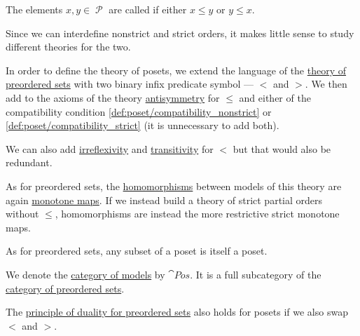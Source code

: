 \begin{definition}
  The elements \( x, y \in \mscrP \) are called  if either \( x \leq y \) or \( y \leq x \).

  \begin{thmenum}[resume=def:poset]
     Since we can interdefine nonstrict and strict orders, it makes little sense to study different theories for the two.

    In order to define the theory of posets, we extend the language of the \hyperref[def:preordered_set/theory]{theory of preordered sets} with two binary infix predicate symbol --- \( < \) and \( > \). We then add to the axioms of the theory \hyperref[def:binary_relation/antisymmetric]{antisymmetry} for \( \leq \) and either of the compatibility condition \eqref{def:poset/compatibility_nonstrict} or \eqref{def:poset/compatibility_strict} (it is unnecessary to add both).

    We can also add \hyperref[def:binary_relation/irreflexive]{irreflexivity} and \hyperref[def:binary_relation/transitive]{transitivity} for \( < \) but that would also be redundant.

     As for preordered sets, the \hyperref[def:first_order_homomorphism]{homomorphisms} between models of this theory are again \hyperref[def:preordered_set/homomorphism]{monotone maps}. If we instead build a theory of strict partial orders without \( \leq \), homomorphisms are instead the more restrictive strict monotone maps.

     As for preordered sets, any subset of a poset is itself a poset.

     We denote the \hyperref[def:category_of_first_order_models]{category of models} by \( \cat{Pos} \). It is a full subcategory of the \hyperref[def:preordered_set/category]{category of preordered sets}.

     The \hyperref[def:preordered_set/duality]{principle of duality for preordered sets} also holds for posets if we also swap \( < \) and \( > \).
  \end{thmenum}
\end{definition}
